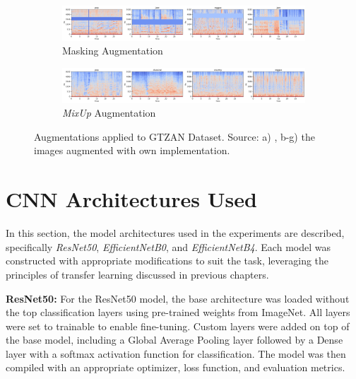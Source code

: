 \begin{figure}[!htb]
    \begin{subfigure}{0.9\textwidth}
        \includegraphics[scale=0.28]{Images/gtzan_new/masking_augmentation.png}
        \caption{Masking Augmentation}
    \end{subfigure}

    \begin{subfigure}{0.9\textwidth}
        \includegraphics[scale=0.28]{Images/gtzan_mixup_augmentation.png}
        \caption{\textit{MixUp} Augmentation}
    \end{subfigure}

    \caption{Augmentations applied to GTZAN Dataset. Source: a) \cite{GTZAN}, b-g) the images augmented with own implementation.}
    \label{fig:GTZANAugmentations}
\end{figure}




\section{CNN Architectures Used}

In this section, the model architectures used in the experiments are described, specifically \textit{ResNet50}, \textit{EfficientNetB0}, and \textit{EfficientNetB4}. Each model was constructed with appropriate modifications to suit the task, leveraging the principles of transfer learning discussed in previous chapters.

\textbf{ResNet50:} For the ResNet50 model, the base architecture was loaded without the top classification layers using pre-trained weights from ImageNet. All layers were set to trainable to enable fine-tuning. Custom layers were added on top of the base model, including a Global Average Pooling layer followed by a Dense layer with a softmax activation function for classification. The model was then compiled with an appropriate optimizer, loss function, and evaluation metrics.

